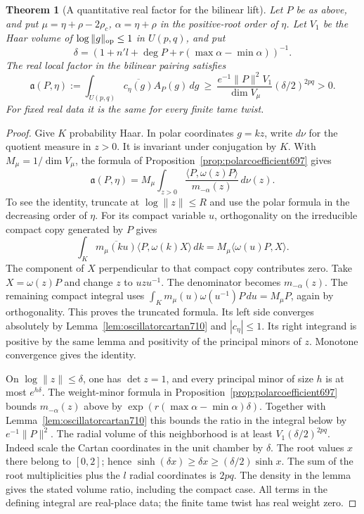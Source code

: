 \documentclass[a4paper,11pt]{article}
\newtheorem{theorem}[proposition]{Theorem}
\theoremstyle{definition}
\theoremstyle{remark}
\numberwithin{equation}{section}
\begin{document}
\begin{theorem}[A quantitative real factor for the bilinear lift]\leavevmode
\label{thm:realgram710}
Let \(P\) be as above, and put \(\mu=\eta+\rho-2\rho_c\),
\(\alpha=\eta+\rho\) in the positive-root order of \(\eta\).
Let \(V_1\) be the Haar volume of \(\log\|g\|_{\rm op}\le1\)
in \(U(p,q)\), and put
\[
 \delta=(1+n'l+\deg P+r(\max\alpha-\min\alpha))^{-1}.
\]
The real local factor in the bilinear pairing satisfies
\[
 \mathfrak a(P,\eta):=\int_{U(p,q)}\overline{c_\eta(g)}
                   A_P(g)\,dg
 \ \ge\ \frac{e^{-1}\|P\|^2V_1}{\dim V_\mu}
                     (\delta/2)^{2pq}>0 .
\]
For fixed real data it is the same for every finite tame twist.
\end{theorem}
\begin{proof}
Give \(K\) probability Haar. In polar coordinates \(g=kz\),
write \(d\nu\) for the quotient measure in \(z>0\). It is
invariant under conjugation by \(K\). With \(M_\mu=1/\dim
V_\mu\), the formula of Proposition~\ref{prop:polarcoefficient697}
gives
\[
      \mathfrak a(P,\eta)=M_\mu\int_{z>0}
             \frac{\langle P,\omega(z)P\rangle}
                  {m_{-\alpha}(z)}\,d\nu(z).
\]
To see the identity, truncate at \(\log\|z\|\le R\) and use
the polar formula in the decreasing order of \(\eta\).
For its compact variable \(u\), orthogonality on the
irreducible compact copy generated by \(P\) gives
\[
 \int_K\overline{m_\mu(ku)}
       \langle P,\omega(k)X\rangle\,dk
                   =M_\mu\langle\omega(u)P,X\rangle .
\]
The component of \(X\) perpendicular to that compact copy
contributes zero. Take \(X=\omega(z)P\) and change \(z\)
to \(uzu^{-1}\). The denominator becomes \(m_{-\alpha}(z)\).
The remaining compact integral uses
\(\int_K m_\mu(u)\omega(u^{-1})P\,du=M_\mu P\), again by
orthogonality. This proves the truncated formula. Its left
side converges absolutely by Lemma~\ref{lem:oscillatorcartan710}
and \(|c_\eta|\le1\). Its right integrand is positive by
the same lemma and positivity of the principal minors of
\(z\). Monotone convergence gives the identity.

On \(\log\|z\|\le\delta\), one has \(\det z=1\), and every
principal minor of size \(h\) is at most \(e^{h\delta}\).
The weight-minor formula in Proposition~\ref{prop:polarcoefficient697}
bounds \(m_{-\alpha}(z)\) above by
\(\exp(r(\max\alpha-\min\alpha)\delta)\). Together with
Lemma~\ref{lem:oscillatorcartan710} this bounds the ratio in
the integral below by \(e^{-1}\|P\|^2\). The radial volume
of this neighborhood is at least \(V_1(\delta/2)^{2pq}\).
Indeed scale the Cartan coordinates in the unit chamber by
\(\delta\). The root values \(x\) there belong to \([0,2]\);
hence \(\sinh(\delta x)\ge\delta x\ge(\delta/2)\sinh x\).
The sum of the root multiplicities plus the \(l\) radial
coordinates is \(2pq\). The density in the lemma gives the
stated volume ratio, including the compact case. All terms
in the defining integral are real-place data; the finite
tame twist has real weight zero.
\end{proof}
\end{document}
